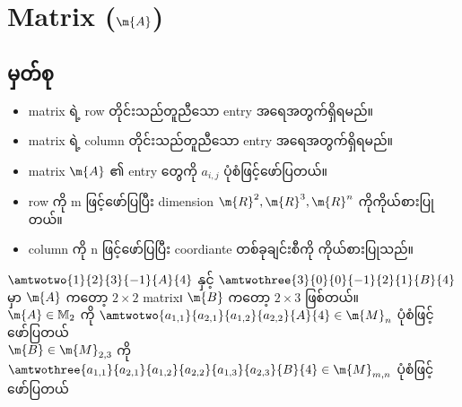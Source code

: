 \section{Matrix ($\m{A}$)}
\subsection{မှတ်စု}
\begin{itemize}
    \item matrix ရဲ့ row တိုင်းသည်တူညီသော entry အရေအတွက်ရှိရမည်။
    \item matrix ရဲ့ column တိုင်းသည်တူညီသော entry အရေအတွက်ရှိရမည်။
    \item matrix $\m{A}$ ၏ entry တွေကို $a_{i,j}$ ပုံစံဖြင့်ဖော်ပြတယ်။
    \item row ကို m ဖြင့်ဖော်ပြပြီး dimension $\m{R}^2,\m{R}^3,\m{R}^n$ ကိုကိုယ်စားပြုတယ်။
    \item column ကို n ဖြင့်ဖော်ပြပြီး coordiante တစ်ခုချင်းစီကို ကိုယ်စားပြုသည်။
\end{itemize}
$\amtwotwo{1}{2}{3}{-1}{A}{4}$ နှင့် $\amtwothree{3}{0}{0}{-1}{2}{1}{B}{4}$ မှာ $\m{A}$ ကတော့ $2\times2$ matrix၊ $\m{B}$ ကတော့ $2\times3$ ဖြစ်တယ်။ \\[1ex]
$\m{A}\in\mathbb{M}_2$ ကို $\amtwotwo{a_{1,1}}{a_{2,1}}{a_{1,2}}{a_{2,2}}{A}{4}\in\m{M}_n$ ပုံစံဖြင့်ဖော်ပြတယ် \\[1ex]
$\m{B}\in\m{M}_{2,3}$ ကို  $\amtwothree{a_{1,1}}{a_{2,1}}{a_{1,2}}{a_{2,2}}{a_{1,3}}{a_{2,3}}{B}{4}\in\m{M}_{m,n}$ ပုံစံဖြင့်ဖော်ပြတယ် \\[1ex]
